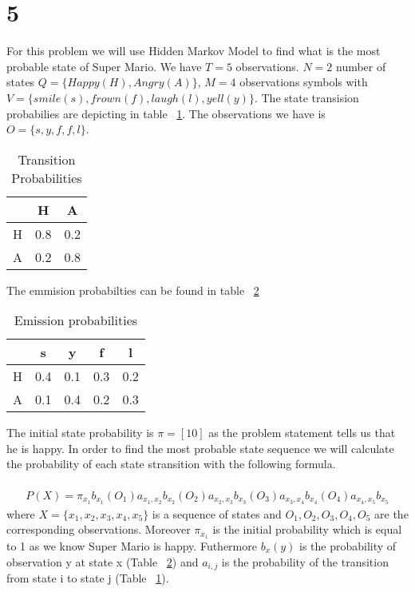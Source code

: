 \section*{5}
For this problem we will use Hidden Markov Model to find what is the most probable
state of Super Mario. We have $T=5$ observations. $N=2$ number of states $Q=\{Happy(H), Angry(A)\}$,
$M=4$ observations symbols with $V=\{smile(s), frown(f), laugh(l), yell(y)\}$.
The state transision probabilies are depicting in table ~\ref{tab:a}. The observations
we have is $O = \{s, y, f, f, l\}$.
\begin{table}[ht]
 \centering
  \begin{tabular}{ | c || c | c | }
    \hline
     & H & A \\ \hline
    H & 0.8 & 0.2 \\ \hline
    A & 0.2 & 0.8 \\ \hline
  \end{tabular}
    \caption{Transition Probabilities}\label{tab:a}
\end{table}
The emmision probabilties can be found in table ~\ref{tab:b}
\begin{table}[ht]
 \centering
  \begin{tabular}{ | c || c | c | c | c | }
    \hline
     & s & y & f & l \\ \hline
    H & 0.4 & 0.1 & 0.3 & 0.2 \\ \hline
    A & 0.1 & 0.4 & 0.2 & 0.3 \\ \hline
  \end{tabular}
    \caption{Emission probabilities}\label{tab:b}
\end{table}
The initial state probability is $\pi = [ 1 0 ]$ as the problem statement tells us that he is happy.
In order to find the most probable state sequence we will calculate the probability of each state stransition
with the following formula.\\
\\
\begin{align*}
P(X) = \pi_{x_1}b_{x_1}(O_1)a_{{x_1},{x_2}}b_{x_2}(O_2)a_{{x_2},{x_3}}b_{x_3}(O_3)a_{{x_3},{x_4}}b_{x_4}(O_4)a_{{x_4},{x_5}}b_{x_5}
\end{align*}
where $X = \{x_{1}, x_{2}, x_{3}, x_{4}, x_{5}\}$ is a sequence of states and $O_{1},O_{2},O_{3},O_{4},O_{5}$ 
are the corresponding observations. Moreover $\pi_{x_1}$ is the initial probability which is equal 
to 1 as we know Super Mario is happy. Futhermore $b_x(y)$ is the probability of observation y at state x (Table ~\ref{tab:b}) and
$a_{i,j}$ is the probability of the transition from state i to state j (Table ~\ref{tab:a}).
